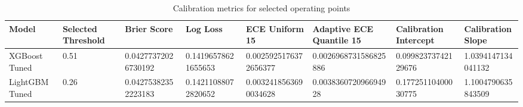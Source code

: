 \begin{table}[htbp]
\centering
\caption{Calibration metrics for selected operating points}
\begin{tabular}{llllllll}
\hline
Model & Selected Threshold & Brier Score & Log Loss & ECE Uniform 15 & Adaptive ECE Quantile 15 & Calibration Intercept & Calibration Slope \\
\hline
XGBoost Tuned & 0.51 & 0.04277372026730192 & 0.14196578621655653 & 0.0025925176372656377 & 0.0026968731586825886 & 0.09982373742129676 & 1.0394147134041132 \\
LightGBM Tuned & 0.26 & 0.04275382352223183 & 0.14211088072820652 & 0.0032418563690034628 & 0.003836072096694928 & 0.17725110400030775 & 1.1004790635843509 \\
\hline
\end{tabular}
\end{table}
